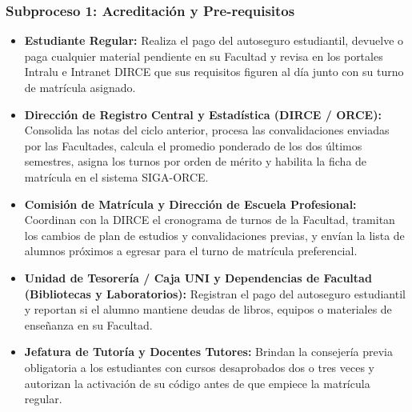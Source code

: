 \subsubsection{Subproceso 1: Acreditación y Pre-requisitos}

\begin{itemize}
    \item \textbf{Estudiante Regular:} Realiza el pago del autoseguro estudiantil, devuelve o paga cualquier material pendiente en su Facultad y revisa en los portales Intralu e Intranet DIRCE que sus requisitos figuren al día junto con su turno de matrícula asignado.

    \item \textbf{Dirección de Registro Central y Estadística (DIRCE / ORCE):} Consolida las notas del ciclo anterior, procesa las convalidaciones enviadas por las Facultades, calcula el promedio ponderado de los dos últimos semestres, asigna los turnos por orden de mérito y habilita la ficha de matrícula en el sistema SIGA-ORCE.

    \item \textbf{Comisión de Matrícula y Dirección de Escuela Profesional:} Coordinan con la DIRCE el cronograma de turnos de la Facultad, tramitan los cambios de plan de estudios y convalidaciones previas, y envían la lista de alumnos próximos a egresar para el turno de matrícula preferencial.

    \item \textbf{Unidad de Tesorería / Caja UNI y Dependencias de Facultad (Bibliotecas y Laboratorios):} Registran el pago del autoseguro estudiantil y reportan si el alumno mantiene deudas de libros, equipos o materiales de enseñanza en su Facultad.

    \item \textbf{Jefatura de Tutoría y Docentes Tutores:} Brindan la consejería previa obligatoria a los estudiantes con cursos desaprobados dos o tres veces y autorizan la activación de su código antes de que empiece la matrícula regular.
\end{itemize}
